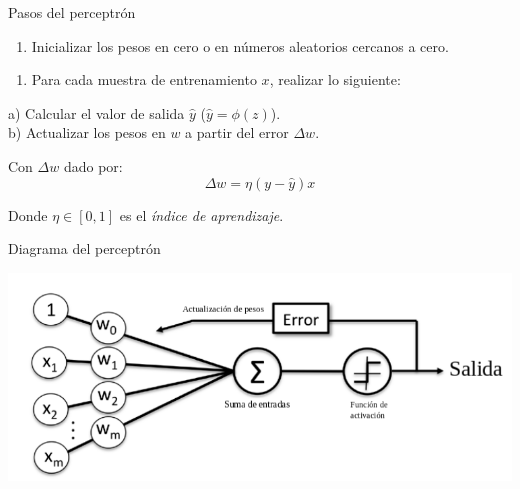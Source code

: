 \documentclass[presentation]{beamer}
\begin{document}
\begin{frame}[label={sec:org47bafc0}]{Pasos del perceptrón}
\begin{enumerate}
\item Inicializar los pesos en cero o en números aleatorios cercanos a cero.
\end{enumerate}
\pause
\begin{enumerate}
\item Para cada muestra de entrenamiento \(x\), realizar lo siguiente:
\end{enumerate}
\pause
a) Calcular el valor de salida \(\hat y\) (\(\hat y = \phi(z)\)).\\
\pause
b) Actualizar los pesos en \(w\) a partir del error \(\Delta w\).

Con \(\Delta w\) dado por:
\begin{equation*}
\Delta w = \eta (y - \hat y)x
\end{equation*}

Donde \(\eta \in [0,1]\) es el \emph{índice de aprendizaje}.
\end{frame}

\begin{frame}[label={sec:orga4e94aa}]{Diagrama del perceptrón}
\begin{center}
\includegraphics[width=.9\linewidth]{images/perceptron-summary.png}
\end{center}
\end{frame}
\end{document}
